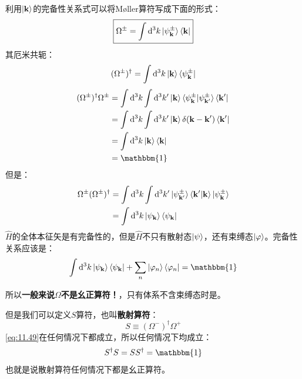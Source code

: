 \documentclass[a4paper,zihao=-4,linespread=1]{ctexrep}
\begin{document}
	利用$\ket{\mathbf{k}}$的完备性关系式可以将Møller算符写成下面的形式：
	\begin{equation}
		\boxed{
			\Omega^\pm=\int \mathrm{d}^3k\ket{\psi^\pm_{\mathbf{k}}}\bra{\mathbf{k}}
		}
	\end{equation}
	其厄米共轭：
	\begin{equation}
			(\Omega^\pm)^\dagger=\int \mathrm{d}^3k\ket{\mathbf{k}}\bra{\psi^\pm_{\mathbf{k}}}
	\end{equation}
	\begin{equation}
		\label{eq:11.49}
		\begin{aligned}
			(\Omega^\pm)^\dagger \Omega^\pm&=\int \mathrm{d}^3k\int \mathrm{d}^3k^\prime\ket{\mathbf{k}}\braket{\psi^\pm_{\mathbf{k}}|\psi^\pm_{\mathbf{k^\prime}}}\bra{\mathbf{k^\prime}}\\
			&=\int \mathrm{d}^3k\int \mathrm{d}^3k^\prime\ket{\mathbf{k}}\delta(\mathbf{k}-\mathbf{k}^\prime)\bra{\mathbf{k^\prime}}\\
			&=\int \mathrm{d}^3k\ket{\mathbf{k}}\bra{\mathbf{k}}\\
			&=\mathbbm{1}
		\end{aligned}
	\end{equation}
	但是：
	\begin{equation}
		\begin{aligned}
			\Omega^\pm(\Omega^\pm)^\dagger &=\int \mathrm{d}^3k\int \mathrm{d}^3k^\prime \ket{\psi^\pm_{\mathbf{k^\prime}}}\braket{\mathbf{k^\prime}|\mathbf{k}}\ket{\psi^\pm_{\mathbf{k}}}\\
			&=\int \mathrm{d}^3k \ket{\psi_\mathbf{k}}\bra{\psi_\mathbf{k}}
		\end{aligned}
	\end{equation}
	$\hat H$的全体本征矢是有完备性的，但是$\hat H$不只有散射态$\ket{\psi}$，还有束缚态$\ket{\varphi}$。完备性关系应该是：
	\[\int \mathrm{d}^3k \ket{\psi_\mathbf{k}}\bra{\psi_\mathbf{k}}+\sum_n \ket{\varphi_n}\bra{\varphi_n}=\mathbbm{1}\]
	
	所以\textbf{一般来说$\Omega$不是幺正算符！}，只有体系不含束缚态时是。
	
	但是我们可以定义$S$算符，也叫\textbf{散射算符}：
	\begin{equation}
		\boxed{S\equiv (\Omega^-)^\dagger\Omega^+}
	\end{equation}
	\ref{eq:11.49}在任何情况下都成立，所以任何情况下均成立：
	\[S^\dagger S=SS^\dagger=\mathbbm{1}\]
	也就是说散射算符任何情况下都是幺正算符。
	
\end{document}
